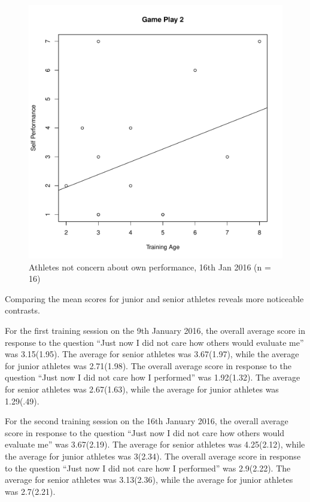 \begin{CJK}{UTF8}{gbsn}
\begin{figure}[htbp]
  \centering
\includegraphics[scale=.5]{images/indPerf0116TrainingAge.pdf}
  \caption{Athletes not concern about own performance, 16th Jan 2016 (n = 16)}
  \label{fig:indPerf0116TrainingAge}
\end{figure}



Comparing the mean scores for junior and senior athletes reveals more  noticeable contrasts.

For the first training session on the 9th January 2016, the overall average score in response to the question ``Just now I did not care how others would evaluate me'' was 3.15(1.95).  The average for senior athletes was 3.67(1.97), while the average for junior athletes was 2.71(1.98).
The overall average score in response to the question ``Just now I did not care how I performed'' was 1.92(1.32).  The average for senior athletes was 2.67(1.63), while the average for junior athletes was 1.29(.49).

For the second training session on the 16th January 2016, the overall average score in response to the question ``Just now I did not care how others would evaluate me'' was 3.67(2.19).  The average for senior athletes was 4.25(2.12), while the average for junior athletes was 3(2.34).
The overall average score in response to the question ``Just now I did not care how I performed'' was 2.9(2.22).  The average for senior athletes was 3.13(2.36), while the average for junior athletes was 2.7(2.21).



\end{CJK}
